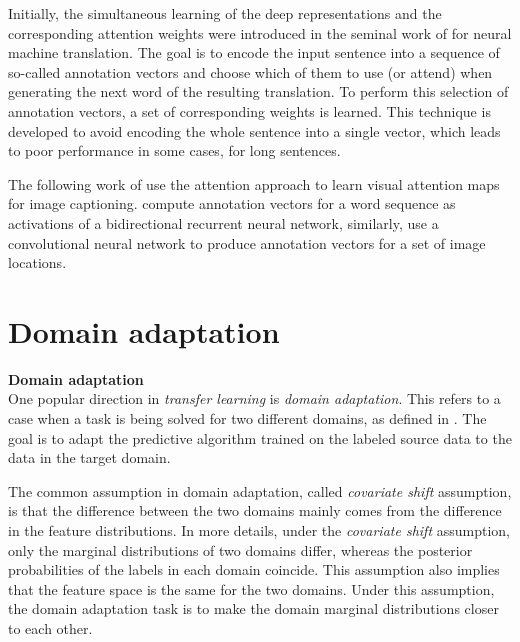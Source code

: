 Initially, the simultaneous learning of the deep representations and the corresponding attention weights were introduced in the seminal work of \citep{BahdanauCB14} for neural machine translation. The goal is to encode the input sentence into a sequence of so-called annotation vectors and choose which of them to use (or attend) when generating the next word of the resulting translation. To perform this selection of annotation vectors, a set of corresponding weights is learned. This technique is developed to avoid encoding the whole sentence into a single vector, which leads to poor performance in some cases, \eg{} for long sentences. 

The following work of \citep{xu2015show} use the attention approach to learn visual attention maps for image captioning. \citep{BahdanauCB14} compute annotation vectors for a word sequence as activations of a bidirectional recurrent neural network, similarly, \citep{xu2015show} use a convolutional neural network to produce annotation vectors for a set of image locations.





\section{Domain adaptation} %

\bigskip\ident\textbf{Domain adaptation}\\
One popular direction in \textit{transfer learning} is \textit{domain adaptation}. This refers to a case when a  task is being solved for two different domains, as defined in \citep{pan2010survey}. The goal is to adapt the predictive algorithm trained on the labeled source data to the data in the target domain. %

The common assumption in domain adaptation, called \textit{covariate shift} assumption, is that the difference between the two domains mainly comes from the difference in the feature distributions. In more details, under the \textit{covariate shift} assumption, only the marginal distributions of two domains differ, whereas the posterior probabilities of the labels in each domain coincide. This assumption also implies that the feature space is the same for the two domains. Under this assumption, the domain adaptation task is to make the domain marginal distributions closer to each other.   

